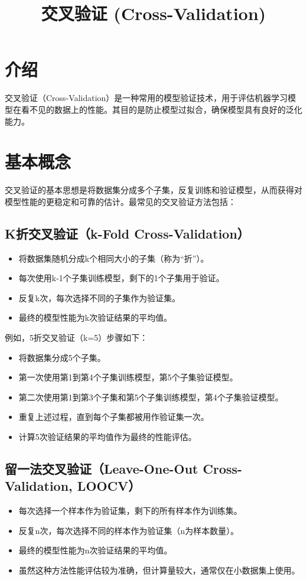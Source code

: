 \documentclass{article}
\title{交叉验证 (Cross-Validation)}
\author{}
\date{}
\begin{document}
\maketitle

\section{介绍}
交叉验证（Cross-Validation）是一种常用的模型验证技术，用于评估机器学习模型在看不见的数据上的性能。其目的是防止模型过拟合，确保模型具有良好的泛化能力。

\section{基本概念}
交叉验证的基本思想是将数据集分成多个子集，反复训练和验证模型，从而获得对模型性能的更稳定和可靠的估计。最常见的交叉验证方法包括：

\subsection{K折交叉验证（k-Fold Cross-Validation）}
\begin{itemize}
  \item 将数据集随机分成k个相同大小的子集（称为“折”）。
  \item 每次使用k-1个子集训练模型，剩下的1个子集用于验证。
  \item 反复k次，每次选择不同的子集作为验证集。
  \item 最终的模型性能为k次验证结果的平均值。
\end{itemize}

例如，5折交叉验证（k=5）步骤如下：
\begin{itemize}
  \item 将数据集分成5个子集。
  \item 第一次使用第1到第4个子集训练模型，第5个子集验证模型。
  \item 第二次使用第1到第3个子集和第5个子集训练模型，第4个子集验证模型。
  \item 重复上述过程，直到每个子集都被用作验证集一次。
  \item 计算5次验证结果的平均值作为最终的性能评估。
\end{itemize}

\subsection{留一法交叉验证（Leave-One-Out Cross-Validation, LOOCV）}
\begin{itemize}
  \item 每次选择一个样本作为验证集，剩下的所有样本作为训练集。
  \item 反复n次，每次选择不同的样本作为验证集（n为样本数量）。
  \item 最终的模型性能为n次验证结果的平均值。
  \item 虽然这种方法性能评估较为准确，但计算量较大，通常仅在小数据集上使用。
\end{itemize}
\end{document}
